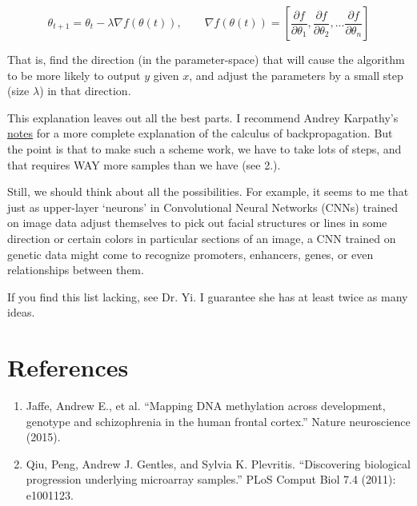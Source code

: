 \documentclass[]{article}
\begin{document}
\begin{enumerate}
    $$\theta_{t+1} = \theta_{t} - \lambda \nabla f(\theta(t)), \qquad \nabla f(\theta(t)) = [\frac{\partial f}{\partial \theta_{1}}, \frac{\partial f}{\partial \theta_{2}}, ... \frac{\partial f}{\partial \theta_{n}}]$$

    That is, find the direction (in the parameter-space) that will cause the algorithm to be more likely to output $y$ given $x$, and adjust the parameters by a small step (size $\lambda$) in that direction.
    
    \vspace{-1mm} \quad This explanation leaves out all the best parts. I recommend Andrey Karpathy's \href{http://cs231n.github.io/optimization-2/}{notes} for a more complete explanation of the calculus of backpropagation. But the point is that to make such a scheme work, we have to take lots of steps, and that requires WAY more samples than we have (see 2.).
    
    \vspace{-1mm} \quad Still, we should think about all the possibilities. For example, it seems to me that just as upper-layer `neurons' in Convolutional Neural Networks (CNNs) trained on image data adjust themselves to pick out facial structures or lines in some direction or certain colors in particular sections of an image, a CNN trained on genetic data might come to recognize promoters, enhancers, genes, or even relationships between them.
  \end{enumerate}

  If you find this list lacking, see Dr. Yi. I guarantee she has at least twice as many ideas.

  \section{References}

  \begin{enumerate}
    \item \label{r:jaffe} Jaffe, Andrew E., et al. ``Mapping DNA methylation across development, genotype and schizophrenia in the human frontal cortex.'' Nature neuroscience (2015).
    \item \label{r:spd} Qiu, Peng, Andrew J. Gentles, and Sylvia K. Plevritis. ``Discovering biological progression underlying microarray samples.'' PLoS Comput Biol 7.4 (2011): e1001123.
  \end{enumerate}
\end{document}
